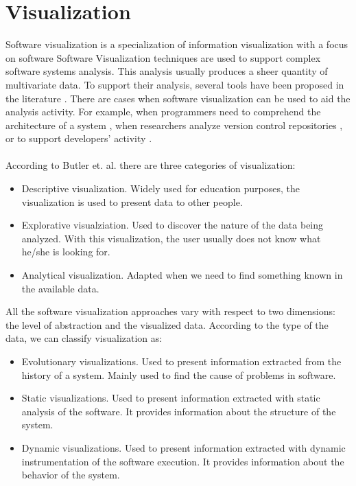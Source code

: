 \section{Visualization}
Software visualization is a specialization of information visualization with a focus on software \cite{Lanza2003}
Software Visualization techniques are used to support complex software systems analysis. 
This analysis usually produces a sheer quantity of multivariate data. To support their analysis, several tools have been proposed in the literature \cite{Merino2018a}.
There are cases when software visualization can be used to aid the analysis activity. For example, when programmers need to comprehend the architecture of a system \cite{Panas2007}, when researchers analyze version control repositories \cite{Greene2017}, or to support developers' activity \cite{LopezHerrejon2018}. \\
\\
According to Butler et. al. \cite{Butler1993} there are three categories of visualization:
\begin{itemize}
	 \item Descriptive visualization. Widely used for education purposes, the visualization is used to present data to other people. 
	 \item Explorative visualziation. Used to discover the nature of the data being analyzed. With this visualization, the user usually does not know what he/she is looking for. 
	 \item Analytical visualization. Adapted when we need to find something known in the available data. 
\end{itemize}
	
All the software visualization approaches vary with respect to two dimensions: the level of abstraction and the visualized data.
According to the type of the data, we can classify visualization as:
\begin{itemize}
	\item Evolutionary visualizations. Used to present information extracted from the history of a system. Mainly used to find the cause of problems in software. 
	\item Static visualizations. Used to present information extracted with static analysis of the software. It provides information about the structure of the system.
	\item Dynamic visualizations. Used to present information extracted with dynamic instrumentation of the software execution. It provides information about the behavior of the system.
\end{itemize}

